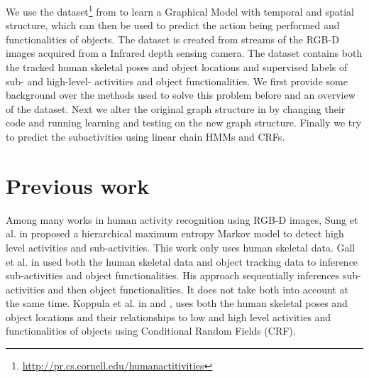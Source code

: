 \documentclass{article} %
\begin{document}
We use the  dataset\footnote{\url{http://pr.cs.cornell.edu/humanactitivities}} from \cite{koppula2013detectingactivitiesrgbd}
 to learn a Graphical Model with temporal and spatial structure, which can then be used to predict the action being performed and functionalities of objects. The dataset is created from streams of the RGB-D images acquired from a Infrared depth sensing camera. The dataset contains both the tracked human skeletal poses and object locations and supervised labels of sub- and high-level- activities and object functionalities. We first provide some background over the methods used to solve this problem before and an overview of the dataset. Next we alter the original graph structure in \cite{koppula2013detectingactivitiesrgbd} by changing their code and running learning and testing on the new graph structure. Finally we try to predict the subactivities using linear chain HMMs and CRFs.
 
 
\section{Previous work} 
Among many works in human activity recognition using RGB-D images, Sung et al. in \cite{sung2012unstructured}
proposed a hierarchical maximum entropy Markov model to detect high level activities and sub-activities. This work only uses human skeletal data. Gall et al. in \cite{gall2011functional} used both the human skeletal data and object tracking data to inference sub-activities and object functionalities. His approach sequentially inferences sub-activities and then object functionalities. It does not take both into account at the same time. Koppula et al. in \cite{koppula2013detectingactivitiesrgbd} and \cite{koppula2013anticipating}, uses both the human skeletal poses and object locations and their relationships to low and high level activities and functionalities of objects using Conditional Random Fields (CRF). 
\end{document}
